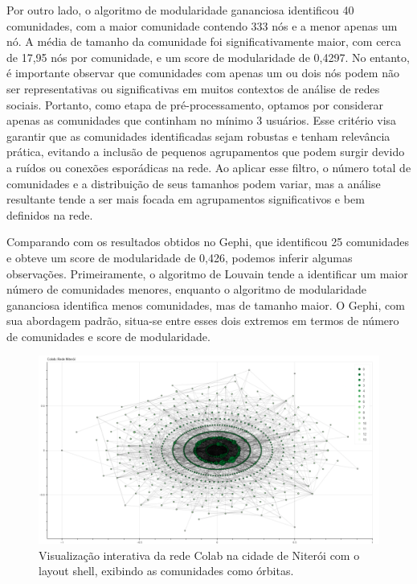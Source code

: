 Por outro lado, o algoritmo de modularidade gananciosa \cite{2004_Clauset} identificou 40 comunidades, com a maior comunidade contendo 333 nós e a menor apenas um nó. A média de tamanho da comunidade foi significativamente maior, com cerca de 17,95 nós por comunidade, e um score de modularidade de 0,4297. No entanto, é importante observar que comunidades com apenas um ou dois nós podem não ser representativas ou significativas em muitos contextos de análise de redes sociais. Portanto, como etapa de pré-processamento, optamos por considerar apenas as comunidades que continham no mínimo 3 usuários. Esse critério visa garantir que as comunidades identificadas sejam robustas e tenham relevância prática, evitando a inclusão de pequenos agrupamentos que podem surgir devido a ruídos ou conexões esporádicas na rede. Ao aplicar esse filtro, o número total de comunidades e a distribuição de seus tamanhos podem variar, mas a análise resultante tende a ser mais focada em agrupamentos significativos e bem definidos na rede.

Comparando com os resultados obtidos no Gephi, que identificou 25 comunidades e obteve um score de modularidade de 0,426, podemos inferir algumas observações. Primeiramente, o algoritmo de Louvain tende a identificar um maior número de comunidades menores, enquanto o algoritmo de modularidade gananciosa identifica menos comunidades, mas de tamanho maior. O Gephi, com sua abordagem padrão, situa-se entre esses dois extremos em termos de número de comunidades e score de modularidade.

\begin{figure}[h]
    \centering
    \includegraphics[scale=0.3]{images/bokeh_plot_niteroi.png}
    \caption{Visualização interativa da rede Colab na cidade de Niterói com o layout shell, exibindo as comunidades como órbitas.}
    \label{fig:bokeh_plot_niteroi}
	\fautor
\end{figure}

